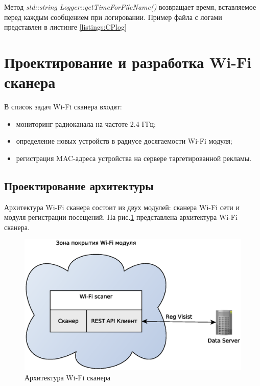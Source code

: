 Метод \textit{std::string Logger::getTimeForFileName()} возвращает время, вставляемое перед каждым сообщением при логировании. Пример файла с логами представлен в листинге \ref{listings:CPlog}

\section{Проектирование и разработка Wi-Fi сканера}

В список задач Wi-Fi сканера входят:

\begin{itemize}
	\item мониторинг радиоканала на частоте 2.4 ГГц;
	\item определение новых устройств в радиусе досягаемости Wi-Fi модуля;
	\item регистрация MAC-адреса устройства на сервере таргетированной рекламы.
\end{itemize}

\subsection{Проектирование архитектуры}

Архитектура Wi-Fi сканера состоит из двух модулей: сканера Wi-Fi сети и модуля регистрации посещений. На рис.\ref{fig:WiFiScanerArch} представлена архитектура Wi-Fi сканера.

\begin{figure}[H]
	\centering
	\includegraphics[width=\linewidth]{fig/WiFiScanerArch}
	\caption{Архитектура Wi-Fi сканера}
	\label{fig:WiFiScanerArch}
\end{figure}

